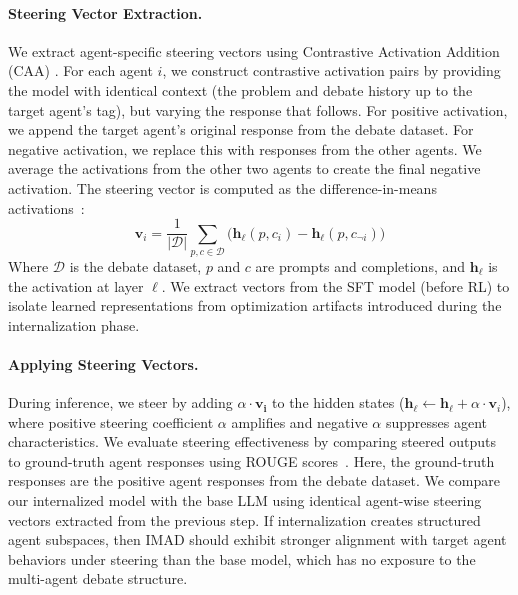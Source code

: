 \documentclass[11pt]{article}
\begin{document}
\paragraph{Steering Vector Extraction.}
We extract agent-specific steering vectors using Contrastive Activation Addition (CAA) \cite{rimsky2024steering}.
For each agent $i$, we construct contrastive activation pairs by providing the model with identical context (the problem and debate history up to the target agent's tag), but varying the response that follows. 
For positive activation, we append the target agent's original response from the debate dataset. For negative activation, we replace this with responses from the other agents. We average the activations from the other two agents to create the final negative activation. 
The steering vector is computed as the difference-in-means activations~\cite{marks2023geometry}:
\begin{equation}
    \mathbf{v}_i = \frac{1}{|\mathcal{D}|}\sum_{p, c \in \mathcal{D}} \Big(\mathbf{h}_\ell(p, c_i) - \mathbf{h}_\ell(p, c_{\neg i})\Big)
\end{equation}
Where $\mathcal{D}$ is the debate dataset, $p$ and $c$ are prompts and completions, and $\mathbf{h}_\ell$ is the activation at layer $\ell$. 
We extract vectors from the SFT model (before RL) to isolate learned representations from optimization artifacts introduced during the internalization phase.

\paragraph{Applying Steering Vectors.}
During inference, we steer by adding $\alpha \cdot \mathbf{v_i}$ to the hidden states ($\mathbf{h}_\ell \leftarrow \mathbf{h}_\ell + \alpha \cdot \mathbf{v}_i$), where positive steering coefficient $\alpha$ amplifies and negative $\alpha$ suppresses agent characteristics. 
We evaluate steering effectiveness by comparing steered outputs to ground-truth agent responses using ROUGE scores~\cite{lin2004rouge}. 
Here, the ground-truth responses are the positive agent responses from the debate dataset.
We compare our internalized model with the base LLM using identical agent-wise steering vectors extracted from the previous step.
If internalization creates structured agent subspaces, then IMAD should exhibit stronger alignment with target agent behaviors under steering than the base model, which has no exposure to the multi-agent debate structure.
\end{document}
